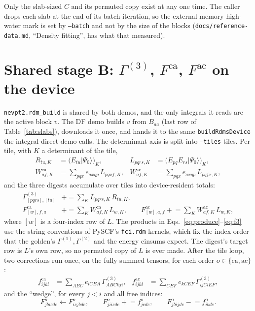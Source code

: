 \documentclass[11pt]{article}
\newcommand{\code}[1]{\texttt{#1}}
\newcommand{\G}[1]{\Gamma^{(#1)}}
\newcommand{\Fca}{F^{\mathrm{ca}}}
\newcommand{\Fac}{F^{\mathrm{ac}}}
\begin{document}
Only the slab-sized $C$ and its permuted copy exist at any one time. The
caller drops each slab at the end of its batch iteration, so the external
memory high-water mark is set by \code{--batch} and not by the size of the
blocks (\code{docs/reference-data.md}, ``Density fitting'', has what that
measured).

\section{\texorpdfstring{Shared stage B: $\G3$, $\Fca$, $\Fac$ on the device}{Shared stage B: dm3, f3ca, f3ac on the device}}
\label{sec:rdm}

\code{nevpt2.rdm\_build} is shared by both demos, and the only integrals it
reads are the active block $v$. The DF demo builds $v$ from $B_{aa}$ (last row
of Table~\ref{tab:slabs}), downloads it once, and hands it to the same
\code{buildRdmsDevice} the integral-direct demo calls. The determinant axis is
split into \code{--tiles} tiles. Per tile, with $K$ a determinant of the tile,
\begin{align}
  R_{tu,K} &= \bigl(E_{tu}|\Psi_0\rangle\bigr)_K, &
  L_{pqrs,K} &= \bigl(E_{pq}E_{rs}|\Psi_0\rangle\bigr)_K,
  \label{eq:produce}\\
  W^{\mathrm{ca}}_{af,K} &= \sum_{pqx} e_{axqp}\,L_{pqxf,K}, &
  W^{\mathrm{ac}}_{af,K} &= \sum_{pqx} e_{axqp}\,L_{pqfx,K},
  \label{eq:consume}
\end{align}
and the three digests accumulate over tiles into device-resident totals:
\begin{align}
  \G3_{[pqrs],[tu]} &\mathrel{+}= \sum_K L_{pqrs,K}\,R_{tu,K},
  \label{eq:dm3}\\
  \Fca_{[w],f,a} &\mathrel{+}= \sum_K W^{\mathrm{ca}}_{af,K}\,L_{w,K},
  \qquad
  \Fac_{[w],a,f} \mathrel{+}= \sum_K W^{\mathrm{ac}}_{af,K}\,L_{w,K},
  \label{eq:f3}
\end{align}
where $[w]$ is a four-index row of $L$. The products in
Eqs.~\eqref{eq:produce}--\eqref{eq:f3} use the string conventions of PySCF's
\code{fci.rdm} kernels, which fix the index order that the golden's
$\G1,\G2$ and the energy einsums expect. The digest's target row is $L$'s
own row, so no permuted copy of $L$ is ever made. After the tile loop, two
corrections run once, on the fully summed tensors, for each order
$o\in\{\mathrm{ca},\mathrm{ac}\}$:
\begin{align}
  f^{\mathrm{ca}}_{ijkl} &= \sum_{ABC} e_{lCBA}\,\G3_{ABCkji}, &
  f^{\mathrm{ac}}_{ijkl} &= \sum_{CEF} e_{kCEF}\,\G3_{ijClEF},
  \label{eq:fdm2}
\end{align}
and the ``wedge'', for every $j<i$ and all free indices:
\begin{equation}
  F^{o}_{jbicde} \gets F^{o}_{icjbde},\qquad
  F^{o}_{jiicde} \mathrel{+}= f^{o}_{jcde},\qquad
  F^{o}_{jbijde} \mathrel{-}= f^{o}_{ibde}.
  \label{eq:wedge}
\end{equation}
\end{document}
